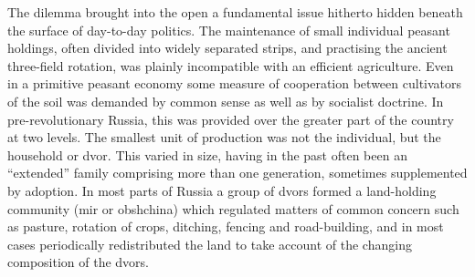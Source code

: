 The dilemma brought into the open a fundamental issue hitherto hidden beneath the surface of day-to-day politics. The maintenance of small individual peasant holdings, often divided into widely separated strips, and practising the ancient three-field rotation, was plainly incompatible with an efficient agriculture. Even in a primitive peasant economy some measure of cooperation between cultivators of the soil was demanded by common sense as well as by socialist doctrine. In pre-revolutionary Russia, this was provided over the greater part of the country at two levels. The smallest unit of production was not the individual, but the household or dvor. This varied in size, having in the past often been an ``extended'' family comprising more than one generation, sometimes supplemented by adoption. In most parts of Russia a group of dvors formed a land-holding community (mir or obshchina) which regulated matters of common concern such as pasture, rotation of crops, ditching, fencing and road-building, and in most cases periodically redistributed the land to take account of the changing composition of the dvors. 

